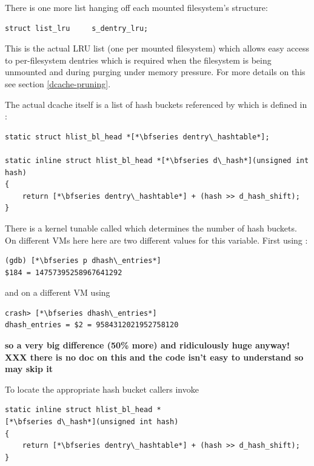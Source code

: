 \noindent
There is one more list hanging off each mounted filesystem's  structure:

\begin{lstlisting}
struct list_lru     s_dentry_lru;
\end{lstlisting}

\noindent
This is the actual LRU list (one per mounted filesystem) which allows easy access to per-filesystem dentries which is required when the filesystem is being unmounted and during purging under memory pressure. For more details on this see section \ref{dcache-pruning}.

The actual dcache itself is a list of hash buckets referenced by  which is defined in :

\begin{lstlisting}
static struct hlist_bl_head *[*\bfseries dentry\_hashtable*];

static inline struct hlist_bl_head *[*\bfseries d\_hash*](unsigned int hash)
{
    return [*\bfseries dentry\_hashtable*] + (hash >> d_hash_shift);
}
\end{lstlisting}

\noindent
There is a kernel tunable called  which determines the number of hash buckets. On different VMs here here are two different values for this variable. First using :

\begin{lstlisting}
(gdb) [*\bfseries p dhash\_entries*]
$184 = 14757395258967641292
\end{lstlisting}

\noindent
and on a different VM using 

\begin{lstlisting}
crash> [*\bfseries dhash\_entries*]
dhash_entries = $2 = 9584312021952758120
\end{lstlisting}

\noindent
\textbf{so a very big difference (50\% more) and ridiculously huge anyway! XXX there is no doc on this and the code isn't easy to understand so may skip it}


\noindent
To locate the appropriate hash bucket callers invoke 

\begin{lstlisting}
static inline struct hlist_bl_head *
[*\bfseries d\_hash*](unsigned int hash)
{
    return [*\bfseries dentry\_hashtable*] + (hash >> d_hash_shift);
}
\end{lstlisting}

